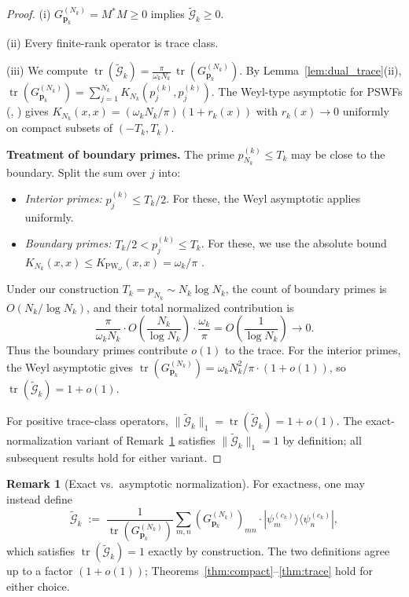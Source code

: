 \documentclass[12pt,a4paper]{amsart}
\theoremstyle{definition}
\newtheorem{remark}[theorem]{Remark}
\newcommand{\PW}{\mathrm{PW}_\omega}
\newcommand{\GVMk}{G^{(N_k)}_{\mathbf{p}_k}}
\newcommand{\norm}[1]{\|#1\|}
\begin{document}
\begin{proof}
(i) $\GVMk=M^*M\geq0$ implies $\widetilde{\mathcal{G}}_k\geq0$.

(ii) Every finite-rank operator is trace class.

(iii) We compute $\operatorname{tr}(\widetilde{\mathcal{G}}_k)
=\frac{\pi}{\omega_k N_k}\,\operatorname{tr}(\GVMk)$.
By Lemma~\ref{lem:dual_trace}(ii),
$\operatorname{tr}(\GVMk)=\sum_{j=1}^{N_k}K_{N_k}(p_j^{(k)},p_j^{(k)})$.
The Weyl-type asymptotic for PSWFs
(\cite[Eq.~(5.4)]{Slepian1978}, \cite[Thm.~1.3]{LandauPollak1962})
gives $K_{N_k}(x,x)=(\omega_k N_k/\pi)(1+r_k(x))$
with $r_k(x)\to0$ uniformly on compact subsets of $(-T_k,T_k)$.

\medskip
\noindent\textbf{Treatment of boundary primes.}
The prime $p_{N_k}^{(k)}\leq T_k$ may be close to the boundary.
Split the sum over $j$ into:
\begin{itemize}
\item \emph{Interior primes:} $p_j^{(k)}\leq T_k/2$.
For these, the Weyl asymptotic applies uniformly.
\item \emph{Boundary primes:} $T_k/2 < p_j^{(k)}\leq T_k$.
For these, we use the absolute bound
$K_{N_k}(x,x)\leq K_{\PW}(x,x)=\omega_k/\pi$
\cite[Eq.~(3)]{BonamiKaroui}.
\end{itemize}
Under our construction $T_k=p_{N_k}\sim N_k\log N_k$,
the count of boundary primes is $O(N_k/\log N_k)$,
and their total normalized contribution is
\[
  \frac{\pi}{\omega_k N_k}\cdot O\!\left(\frac{N_k}{\log N_k}\right)
  \cdot\frac{\omega_k}{\pi}=O\!\left(\frac{1}{\log N_k}\right)\to0.
\]
Thus the boundary primes contribute $o(1)$ to the trace.
For the interior primes, the Weyl asymptotic gives
$\operatorname{tr}(\GVMk)=\omega_k N_k^2/\pi\cdot(1+o(1))$,
so $\operatorname{tr}(\widetilde{\mathcal{G}}_k)=1+o(1)$.

For positive trace-class operators,
$\norm{\widetilde{\mathcal{G}}_k}_1
=\operatorname{tr}(\widetilde{\mathcal{G}}_k)=1+o(1)$.
The exact-normalization variant of Remark~\ref{rem:norm_exact}
satisfies $\norm{\widetilde{\mathcal{G}}_k}_1=1$ by definition;
all subsequent results hold for either variant.
\end{proof}

\begin{remark}[Exact vs.\ asymptotic normalization]\label{rem:norm_exact}
For exactness, one may instead define
\[
  \widetilde{\mathcal{G}}_k
  \;:=\;
  \frac{1}{\operatorname{tr}(\GVMk)}
  \sum_{m,n}(\GVMk)_{mn}\cdot|\psi_m^{(c_k)}\rangle
  \langle\psi_n^{(c_k)}|,
\]
which satisfies $\operatorname{tr}(\widetilde{\mathcal{G}}_k)=1$
exactly by construction. The two definitions agree up to a
factor $(1+o(1))$; Theorems~\ref{thm:compact}--\ref{thm:trace}
hold for either choice.
\end{remark}
\end{document}

